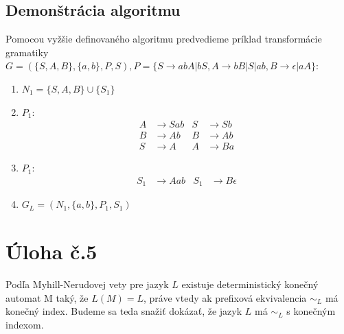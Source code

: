 \documentclass[10pt]{article}
\begin{document}
\subsection*{Demonštrácia algoritmu}
Pomocou vyžšie definovaného algoritmu predvedieme príklad transformácie gramatiky $G = (\{S,A,B\}, \{a, b\}, P, S),
P = \{S\to abA|bS, A\to bB|S|ab, B\to \epsilon | aA \}$:
\begin{enumerate}
    \item $N_1 = \{S, A, B\} \cup \{ S_1\}$
    \item $P_1$: 
            \begin{align*}
                A&\to Sab  & S&\to Sb\\
                B&\to Ab   & B&\to Ab\\
                S&\to A    & A&\to Ba
            \end{align*}
    \item $P_1$: 
            \begin{align*}
                S_1&\to Aab & S_1&\to B\epsilon
            \end{align*}
    \item $G_L = (N_1, \{a,b\}, P_1, S_1)$

\end{enumerate}

\section*{Úloha č.5}
Podľa Myhill-Nerudovej vety pre jazyk $L$ existuje deterministický konečný automat M taký, že $L(M)
= L$, práve vtedy ak prefixová ekvivalencia $\sim_L$ má konečný index. Budeme sa teda snažiť
dokázať, že jazyk $L$ má $\sim_L$ s konečným indexom.
\end{document}
